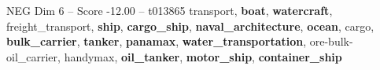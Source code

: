 \begin{textsample}{NEG Dim 6 – Score -12.00 – t013865}  \label{ex:f6_neg_008}
transport, \textbf{boat}, \textbf{watercraft}, freight\_transport, \textbf{ship}, \textbf{cargo\_ship}, \textbf{naval\_architecture}, \textbf{ocean}, cargo, \textbf{bulk\_carrier}, \textbf{tanker}, \textbf{panamax}, \textbf{water\_transportation}, ore-bulk-oil\_carrier, handymax, \textbf{oil\_tanker}, \textbf{motor\_ship}, \textbf{container\_ship}

\end{textsample}
